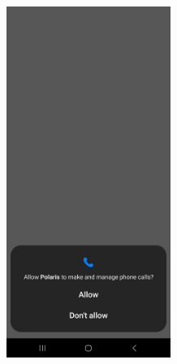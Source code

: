 \begin{itemize}
\begin{center}
		\includegraphics[width=0.4\textwidth]{images/permission-call.jpg}
	\end{center}
	

\end{itemize}

